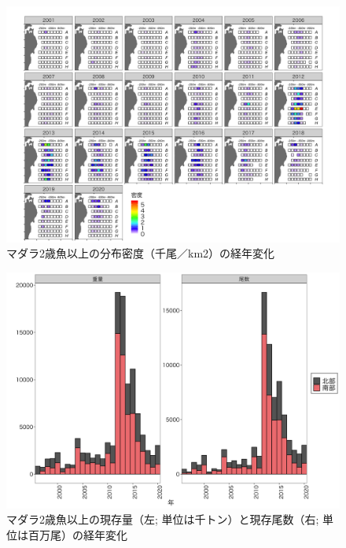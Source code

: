 \documentclass[11pt]{article} %
\begin{document}
\begin{linenumbers}
\begin{figure}[h]
  \centering
  \includegraphics[width = 14cm]{マダラ２＋dens.png}
  \caption{マダラ2歳魚以上の分布密度（千尾／km2）の経年変化}
\end{figure}

\begin{figure}[h]
  \centering
  \includegraphics[width = 14cm]{マダラ２＋trend.png}
  \caption{マダラ2歳魚以上の現存量（左; 単位は千トン）と現存尾数（右; 単位は百万尾）の経年変化}
\end{figure}


\end{linenumbers}
\end{document}
